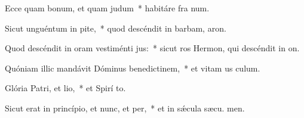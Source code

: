 \item Ecce quam bonum, et quam judum~* habitáre fra  num.
\item Sicut unguéntum in pite,~* quod descéndit in barbam,  aron.
\item Quod descéndit in oram vestiménti jus:~* sicut ros Hermon, qui descéndit in  on.
\item Quóniam illic mandávit Dóminus benedictinem,~* et vitam us  culum.
\item Glória Patri, et lio,~* et Spirí to.
\item Sicut erat in princípio, et nunc, et per,~* et in sǽcula sæcu. men.
